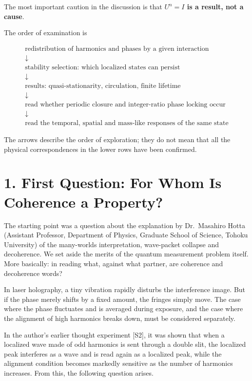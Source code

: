 \documentclass[
  a4paper,
]{article}
\begin{document}
The most important caution in the discussion is that \textbf{\(U^n=I\)
is a result, not a cause}.

The order of examination is

\[
\begin{gathered}
\text{redistribution of harmonics and phases by a given interaction}\\
\downarrow\\
\text{stability selection: which localized states can persist}\\
\downarrow\\
\text{results: quasi-stationarity, circulation, finite lifetime}\\
\downarrow\\
\text{read whether periodic closure and integer-ratio phase locking occur}\\
\downarrow\\
\text{read the temporal, spatial and mass-like responses of the same state}
\end{gathered}
\]

The arrows describe the order of exploration; they do not mean that all
the physical correspondences in the lower rows have been confirmed.

\section{1. First Question: For Whom Is Coherence a
Property?}\label{first-question-for-whom-is-coherence-a-property}

The starting point was a question about the explanation by Dr.~Masahiro
Hotta (Assistant Professor, Department of Physics, Graduate School of
Science, Tohoku University) of the many-worlds interpretation,
wave-packet collapse and decoherence. We set aside the merits of the
quantum measurement problem itself. More basically: in reading what,
against what partner, are coherence and decoherence words?

In laser holography, a tiny vibration rapidly disturbs the interference
image. But if the phase merely shifts by a fixed amount, the fringes
simply move. The case where the phase fluctuates and is averaged during
exposure, and the case where the alignment of high harmonics breaks
down, must be considered separately.

In the author's earlier thought experiment {[}S2{]}, it was shown that
when a localized wave made of odd harmonics is sent through a double
slit, the localized peak interferes as a wave and is read again as a
localized peak, while the alignment condition becomes markedly sensitive
as the number of harmonics increases. From this, the following question
arises.
\end{document}
